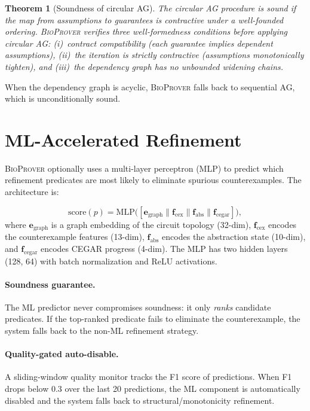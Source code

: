 \documentclass[11pt]{article}
\newtheorem{theorem}{Theorem}
\newcommand{\bioprover}{\textsc{BioProver}}
\newcommand{\cegar}{\textsc{CEGAR}}
\begin{document}
\begin{theorem}[Soundness of circular AG]
\label{thm:ag}
The circular AG procedure is sound if the map from assumptions to
guarantees is contractive under a well-founded ordering. \bioprover{}
verifies three well-formedness conditions before applying circular AG:
(i)~contract compatibility (each guarantee implies dependent
assumptions), (ii)~the iteration is strictly contractive (assumptions
monotonically tighten), and (iii)~the dependency graph has no
unbounded widening chains.
\end{theorem}

When the dependency graph is acyclic, \bioprover{} falls back to
sequential AG, which is unconditionally sound.

\section{ML-Accelerated Refinement}
\label{sec:ml}

\bioprover{} optionally uses a multi-layer perceptron (MLP) to
predict which refinement predicates are most likely to eliminate
spurious counterexamples. The architecture is:

\begin{equation}
  \text{score}(p) = \text{MLP}\!\big(
    [\mathbf{e}_{\text{graph}} \| \mathbf{f}_{\text{cex}} \|
     \mathbf{f}_{\text{abs}} \| \mathbf{f}_{\text{cegar}}]\big),
\end{equation}
where $\mathbf{e}_{\text{graph}}$ is a graph embedding of the circuit
topology (32-dim), $\mathbf{f}_{\text{cex}}$ encodes the
counterexample features (13-dim), $\mathbf{f}_{\text{abs}}$ encodes
the abstraction state (10-dim), and $\mathbf{f}_{\text{cegar}}$
encodes \cegar{} progress (4-dim). The MLP has two hidden layers
(128, 64) with batch normalization and ReLU activations.

\paragraph{Soundness guarantee.}
The ML predictor never compromises soundness: it only \emph{ranks}
candidate predicates. If the top-ranked predicate fails to eliminate
the counterexample, the system falls back to the non-ML refinement
strategy.

\paragraph{Quality-gated auto-disable.}
A sliding-window quality monitor tracks the F1 score of predictions.
When F1 drops below 0.3 over the last 20 predictions, the ML
component is automatically disabled and the system falls back to
structural/monotonicity refinement.
\end{document}
